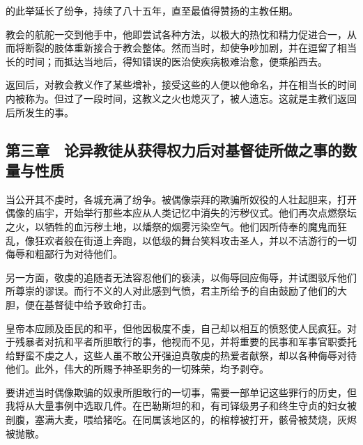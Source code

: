 的此举延长了纷争，持续了八十五年，直至最值得赞扬的主教任期。\par

教会的航舵一交到他手中，他即尝试各种方法，以极大的热忱和精力促进合一，从而将断裂的肢体重新接合于教会整体。然而当时，却使争吵加剧，并在逗留了相当长的时间；而抵达当地后，得知错误的医治使疾病极难治愈，便乘船西去。\par

返回后，对教会教义作了某些增补，接受这些的人便以他命名，并在相当长的时间内被称为。但过了一段时间，这教义之火也熄灭了，被人遗忘。这就是主教们返回后所发生的事。\par


\subsection{第三章　论异教徒从获得权力后对基督徒所做之事的数量与性质}

当公开其不虔时，各城充满了纷争。被偶像崇拜的欺骗所奴役的人壮起胆来，打开偶像的庙宇，开始举行那些本应从人类记忆中消失的污秽仪式。他们再次点燃祭坛之火，以牺牲的血污秽土地，以燔祭的烟雾污染空气。他们因所侍奉的魔鬼而狂乱，像狂欢者般在街道上奔跑，以低级的舞台笑料攻击圣人，并以不洁游行的一切侮辱和粗鄙行为对待他们。\par

另一方面，敬虔的追随者无法容忍他们的亵渎，以侮辱回应侮辱，并试图驳斥他们所尊崇的谬误。而行不义的人对此感到气愤，君主所给予的自由鼓励了他们的大胆，便在基督徒中给予致命打击。\par

皇帝本应顾及臣民的和平，但他因极度不虔，自己却以相互的愤怒使人民疯狂。对于残暴者对抗和平者所胆敢行的事，他视而不见，并将重要的民事和军事官职委托给野蛮不虔之人，这些人虽不敢公开强迫真敬虔的热爱者献祭，却以各种侮辱对待他们。此外，伟大的所赐予神圣职务的一切殊荣，均予剥夺。\par

要讲述当时偶像欺骗的奴隶所胆敢行的一切事，需要一部单记这些罪行的历史，但我将从大量事例中选取几件。在巴勒斯坦的和，有司铎级男子和终生守贞的妇女被剖腹，塞满大麦，喂给猪吃。在同属该地区的，的棺椁被打开，骸骨被焚烧，灰烬被抛散。\par

